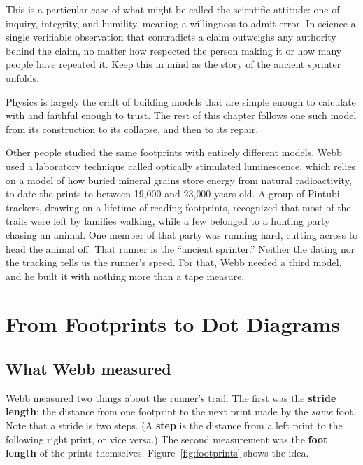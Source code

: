 \documentclass[11pt,twoside,openany]{book}
\begin{document}
This is a particular case of what might be called the scientific attitude: one of inquiry, integrity, and humility, meaning a willingness to admit error. In science a single verifiable observation that contradicts a claim outweighs any authority behind the claim, no matter how respected the person making it or how many people have repeated it. Keep this in mind as the story of the ancient sprinter unfolds.

Physics is largely the craft of building models that are simple enough to calculate with and faithful enough to trust. The rest of this chapter follows one such model from its construction to its collapse, and then to its repair.

\begin{modelnote}
Other people studied the same footprints with entirely different models. Webb used a laboratory technique called optically stimulated luminescence, which relies on a model of how buried mineral grains store energy from natural radioactivity, to date the prints to between 19{,}000 and 23{,}000 years old. A group of Pintubi trackers, drawing on a lifetime of reading footprints, recognized that most of the trails were left by families walking, while a few belonged to a hunting party chasing an animal. One member of that party was running hard, cutting across to head the animal off. That runner is the ``ancient sprinter.'' Neither the dating nor the tracking tells us the runner's speed. For that, Webb needed a third model, and he built it with nothing more than a tape measure.
\end{modelnote}

\section{From Footprints to Dot Diagrams}
\label{sec:dotdiagrams}

\subsection{What Webb measured}

Webb measured two things about the runner's trail. The first was the \textbf{stride length}: the distance from one footprint to the next print made by the \emph{same} foot. Note that a stride is two steps. (A \textbf{step} is the distance from a left print to the following right print, or vice versa.) The second measurement was the \textbf{foot length} of the prints themselves. Figure~\ref{fig:footprints} shows the idea.
\end{document}
